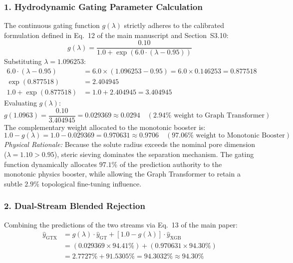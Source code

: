\documentclass[11pt]{article}
\begin{document}
\subsubsection{1. Hydrodynamic Gating Parameter Calculation}
The continuous gating function $g(\lambda)$ strictly adheres to the calibrated formulation defined in Eq.~12 of the main manuscript and Section~S3.10:
\begin{equation}
g(\lambda) = \frac{0.10}{1.0 + \exp\left(6.0 \cdot (\lambda - 0.95)\right)}
\end{equation}
Substituting $\lambda = 1.096253$:
\begin{align}
6.0 \cdot (\lambda - 0.95) &= 6.0 \times (1.096253 - 0.95) = 6.0 \times 0.146253 = 0.877518 \\
\exp(0.877518) &= 2.404945 \\
1.0 + \exp(0.877518) &= 1.0 + 2.404945 = 3.404945
\end{align}
Evaluating $g(\lambda)$:
\begin{equation}
g(1.0963) = \frac{0.10}{3.404945} = 0.029369 \approx 0.0294 \quad (\mathbf{2.94\%} \text{ weight to Graph Transformer})
\end{equation}
The complementary weight allocated to the monotonic booster is:
\begin{equation}
1.0 - g(\lambda) = 1.0 - 0.029369 = 0.970631 \approx 0.9706 \quad (\mathbf{97.06\%} \text{ weight to Monotonic Booster})
\end{equation}
\noindent\textit{Physical Rationale:} Because the solute radius exceeds the nominal pore dimension ($\lambda = 1.10 > 0.95$), steric sieving dominates the separation mechanism. The gating function dynamically allocates $97.1\%$ of the prediction authority to the monotonic physics booster, while allowing the Graph Transformer to retain a subtle $2.9\%$ topological fine-tuning influence.

\subsubsection{2. Dual-Stream Blended Rejection}
Combining the predictions of the two streams via Eq.~13 of the main paper:
\begin{align}
\hat{y}_{\mathrm{GTX}} &= g(\lambda) \cdot \hat{y}_{\mathrm{GT}} + [1.0 - g(\lambda)] \cdot \hat{y}_{\mathrm{XGB}} \nonumber \\
&= (0.029369 \times 94.41\%) + (0.970631 \times 94.30\%) \nonumber \\
&= 2.7727\% + 91.5305\% = 94.3032\% \approx \mathbf{94.30\%}
\end{align}
\end{document}
